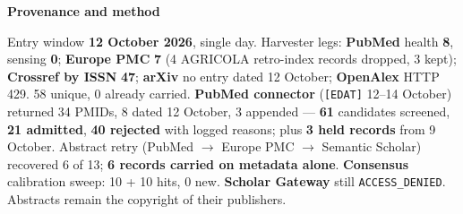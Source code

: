 \documentclass[10pt]{article}
\begin{document}
\begin{keybox}
{\sffamily\bfseries\footnotesize\color{Deep}Provenance and method}\\[1.2mm]
{\fontsize{7.2}{8.8}\selectfont
Entry window \textbf{12 October 2026}, single day. Harvester legs: \textbf{PubMed} health \textbf{8},
sensing \textbf{0}; \textbf{Europe PMC} \textbf{7} (4 AGRICOLA retro-index records dropped, 3 kept);
\textbf{Crossref by ISSN} \textbf{47}; \textbf{arXiv} no entry dated 12 October; \textbf{OpenAlex} HTTP 429.
58 unique, 0 already carried. \textbf{PubMed connector} (\texttt{[EDAT]} 12--14 October) returned 34 PMIDs,
8 dated 12 October, 3 appended --- \textbf{61} candidates screened, \textbf{21 admitted}, \textbf{40 rejected}
with logged reasons; plus \textbf{3 held records} from 9 October. Abstract retry (PubMed $\to$ Europe PMC $\to$
Semantic Scholar) recovered 6 of 13; \textbf{6 records carried on metadata alone}. \textbf{Consensus}
calibration sweep: 10 + 10 hits, 0 new.
\textbf{Scholar Gateway} still \texttt{ACCESS\_DENIED}. Abstracts remain the copyright of their publishers.\par}
\end{keybox}
\end{document}

